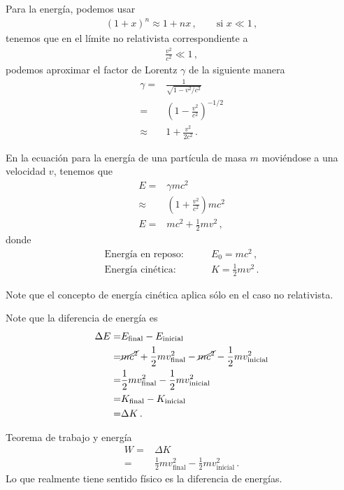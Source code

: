 \documentclass[11pt,a4paper]{article}
\begin{document}
Para la energía, podemos usar
\begin{align*}
    (1+x)^n \approx 1+nx\,,\qquad\text{si $x\ll 1$}\,,
\end{align*}
tenemos que en el límite no relativista correspondiente a 
\begin{align*}
    \frac{v^2}{c^2} \ll 1\,,
\end{align*}
podemos aproximar el factor de Lorentz $\gamma$ de la siguiente manera
\begin{align}
    \gamma =&\frac{1}{\sqrt{1-v^2/c^2}}\nonumber\\
    =& \left(1-\frac{v^2}{c^2}\right)^{-1/2}\nonumber\\
    \approx& 1+\frac{v^2}{2c^2}\,.
\end{align}


En la ecuación para la energía de una partícula de masa $m$ moviéndose a una velocidad $v$, tenemos que
\begin{align*}
    E =& \gamma m c^2\nonumber\\
     \approx& \left(1+\frac{v^2}{c^2}\right)mc^2\nonumber\\
      E=&mc^2 + \frac{1}{2}m v^2\,,
\end{align*}
donde 
\begin{align}
    \text{Energía en reposo:}\qquad& E_0 = mc^2\,,\\
     \text{Energía cinética:}\qquad& K = \frac{1}{2}mv^2\,.
\end{align}

Note que el concepto de energía cinética aplica sólo en el caso no relativista.

Note que la diferencia de energía es
\begin{align}
    \Delta E =& E_{\text{final}} -E_{\text{inicial}} \nonumber\\
    =& \cancel{mc^2} + \frac{1}{2}mv^2_{\text{final}} -\cancel{mc^2} - \frac{1}{2}mv^2_{\text{inicial}}\nonumber\\
=& \frac{1}{2}mv^2_{\text{final}} - \frac{1}{2}mv^2_{\text{inicial}}\nonumber\\
=& K_\text{final} -K_\text{inicial} \nonumber\\
=& \Delta K\,.
\end{align}

Teorema de trabajo y energía
\begin{align}
    W =& \Delta K\nonumber\\
    =& \frac{1}{2}mv^2_{\text{final}} - \frac{1}{2}mv^2_{\text{inicial}}\,.
\end{align}
Lo que realmente tiene sentido físico es la diferencia de energías.
\end{document}
